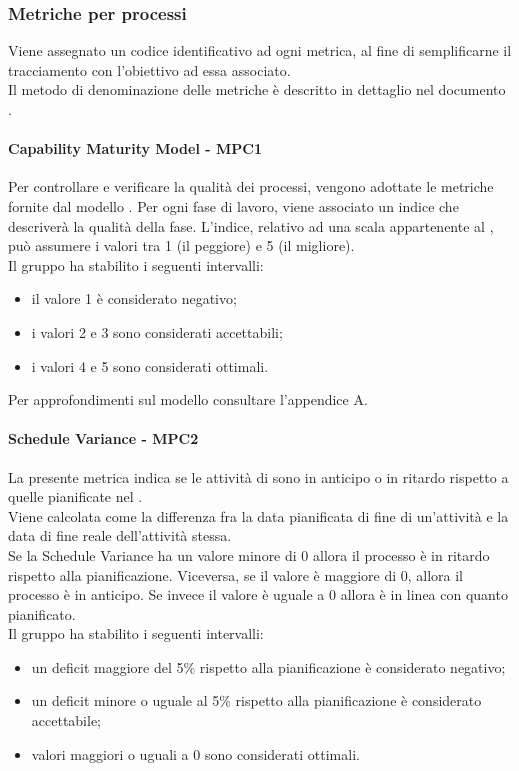\documentclass[PianoDiQualifica.tex]{subfiles}
\begin{document}
		\subsubsection{Metriche per processi}
		Viene assegnato un codice identificativo ad ogni metrica, al fine di semplificarne il tracciamento con l'obiettivo ad essa associato. \\
		Il metodo di denominazione delle metriche è descritto in dettaglio nel documento \NPdocRR{}.
		
			\hypertarget{CMM_m}{\paragraph{Capability Maturity Model - MPC1}}
			Per controllare e verificare la qualità dei processi, vengono adottate le metriche fornite dal modello .
			Per ogni fase di lavoro, viene associato un indice che descriverà la qualità della fase.
			L'indice, relativo ad una scala appartenente al , può assumere i valori tra 1 (il peggiore) e 5 (il migliore). \\
			Il gruppo ha stabilito i seguenti intervalli:
			\begin{itemize}
				\item il valore 1 è considerato negativo;
				\item i valori 2 e 3 sono considerati accettabili;
				\item i valori 4 e 5 sono considerati ottimali.
			\end{itemize}
			Per approfondimenti sul modello  consultare l'appendice A.
			
			\hypertarget{Schedule_m}{\paragraph{Schedule Variance - MPC2}}
			La presente metrica indica se le attività di  sono in anticipo o in ritardo rispetto a quelle pianificate nel \PPdocRR{}. \\
			Viene calcolata come la differenza fra la data pianificata di fine di un’attività e la data di fine reale dell’attività stessa. \\
			Se la Schedule Variance ha un valore minore di 0 allora il processo è in ritardo rispetto alla pianificazione. Viceversa, se il valore è maggiore di 0, allora il processo è
			in anticipo. Se invece il valore è uguale a 0 allora è in linea con quanto pianificato. \\
			Il gruppo ha stabilito i seguenti intervalli:
			\begin{itemize}
				\item un deficit maggiore del 5\% rispetto alla pianificazione è considerato negativo;
				\item un deficit minore o uguale al 5\% rispetto alla pianificazione è considerato accettabile;
				\item valori maggiori o uguali a 0 sono considerati ottimali.
			\end{itemize}
			
\end{document}
